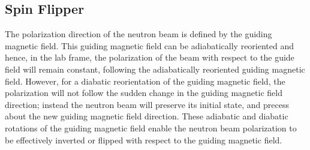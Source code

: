 


\subsection{Spin Flipper}

The polarization direction of the neutron beam is defined by the guiding magnetic field. This guiding magnetic field can be adiabatically reoriented and hence, in the lab frame, the polarization of the beam with respect to the guide field will remain constant, following the adiabatically reoriented guiding magnetic field. However, for a diabatic reorientation of the guiding magnetic field, the polarization will not follow the sudden change in the guiding magnetic field direction; instead the neutron beam will preserve its initial state, and precess about the new guiding magnetic field direction. These adiabatic and diabatic rotations of the guiding magnetic field enable the neutron beam polarization to be effectively inverted or flipped with respect to the guiding magnetic field. 

